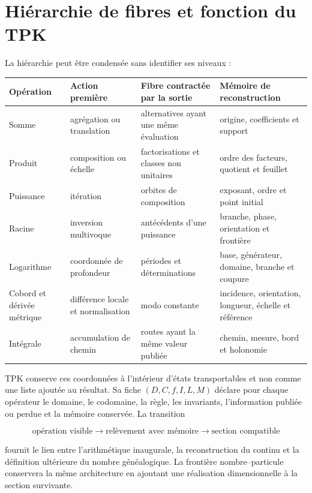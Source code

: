 \section{Hiérarchie de fibres et fonction du TPK}

La hiérarchie peut être condensée sans identifier ses niveaux :

\begin{center}
\small
\begin{tabularx}{\textwidth}{@{}
  >{\raggedright\arraybackslash}p{}
  >{\raggedright\arraybackslash}p{}
  >{\raggedright\arraybackslash}X
  >{\raggedright\arraybackslash}p{}@{}}
\toprule
\textbf{Opération} & \textbf{Action première} &
\textbf{Fibre contractée par la sortie} & \textbf{Mémoire de reconstruction}\\
\midrule
Somme & agrégation ou translation & alternatives ayant une même évaluation &
origine, coefficients et support\\
Produit & composition ou échelle & factorisations et classes non unitaires &
ordre des facteurs, quotient et feuillet\\
Puissance & itération & orbites de composition &
exposant, ordre et point initial\\
Racine & inversion multivoque & antécédents d'une puissance &
branche, phase, orientation et frontière\\
Logarithme & coordonnée de profondeur & périodes et déterminations &
base, générateur, domaine, branche et coupure\\
Cobord et dérivée métrique & différence locale et normalisation & modo constante &
incidence, orientation, longueur, échelle et référence\\
Intégrale & accumulation de chemin & routes ayant la même valeur publiée &
chemin, mesure, bord et holonomie\\
\bottomrule
\end{tabularx}
\end{center}

TPK conserve ces coordonnées à l'intérieur d'états transportables et non comme une
liste ajoutée au résultat. Sa fiche \((D,C,f,I,L,M)\) déclare pour chaque
opérateur le domaine, le codomaine, la règle, les invariants, l'information
publiée ou perdue et la mémoire conservée. La transition

\[
 \text{opération visible}
 \longrightarrow
 \text{relèvement avec mémoire}
 \longrightarrow
 \text{section compatible}
\]

fournit le lien entre l'arithmétique inaugurale, la reconstruction du
continu et la définition ultérieure du nombre généalogique. La frontière
nombre--particule conservera la même architecture en ajoutant une réalisation
dimensionnelle à la section survivante.

